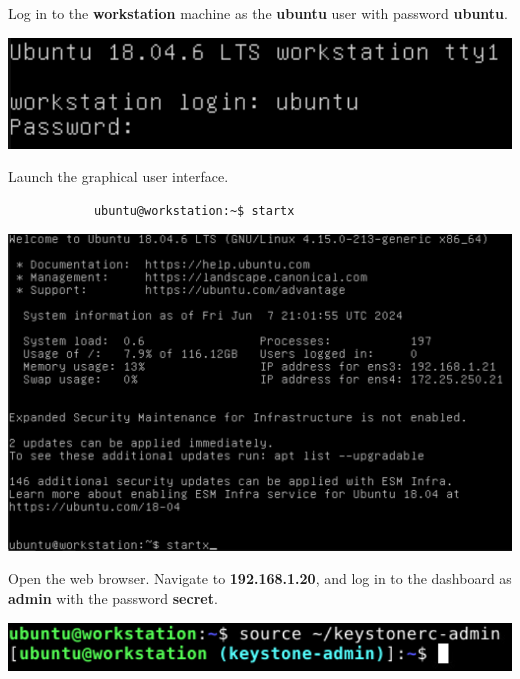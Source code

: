 \documentclass[letterpaper, 12pt]{article}
\begin{document}
\begin{enumerate}
    \begin{labstep}
        Log in to the \textbf{workstation} machine as the \textbf{ubuntu} user with password \textbf{ubuntu}.

        \begin{center}
            \includegraphics[width=\linewidth]{images/part1/step1.png}
        \end{center}
    \end{labstep}

    \begin{labstep}
        Launch the graphical user interface.
        \begin{lstlisting}
            ubuntu@workstation:~$ startx
        \end{lstlisting}

        \begin{center}
            \includegraphics[width=\linewidth]{images/part1/step2.png}
        \end{center}
    \end{labstep}

    \begin{labstep}
        Open the web browser.
        Navigate to \textbf{192.168.1.20}, and log in to the dashboard as \textbf{admin} with the password \textbf{secret}.

        \begin{center}
            \includegraphics[scale=0.5]{images/part1/step3.png}
        \end{center}
    \end{labstep}


\end{enumerate}
\end{document}
